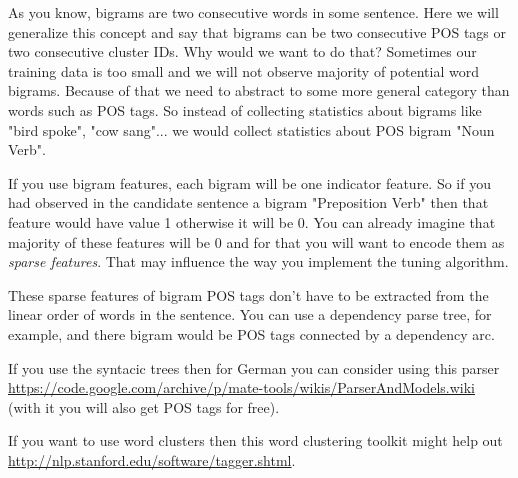 As you know, bigrams are two consecutive words in some sentence. Here we will generalize this concept and say that bigrams can be two consecutive POS tags or two consecutive cluster IDs. Why would we want to do that? Sometimes our training data is too small and we will not observe majority of potential word bigrams. Because of that we need to abstract to some more general category than words such as POS tags. So instead of collecting statistics about bigrams like "bird spoke", "cow sang"... we would collect statistics about POS bigram "Noun Verb".

If you use bigram features, each bigram will be one indicator feature. So if you had observed in the candidate sentence a bigram "Preposition Verb" then that feature would have value 1 otherwise it will be 0. You can already imagine that majority of these features will be 0 and for that you will want to encode them as \textit{sparse features}. That may influence the way you implement the tuning algorithm.

These sparse features of bigram POS tags don't have to be extracted from the linear order of words in the sentence. You can use a dependency parse tree, for example, and there bigram would be POS tags connected by a dependency arc.

If you use the syntacic trees then for German you can consider using this parser \url{https://code.google.com/archive/p/mate-tools/wikis/ParserAndModels.wiki} (with it you will also get POS tags for free).

If you want to use word clusters then this word clustering toolkit might help out \url{http://nlp.stanford.edu/software/tagger.shtml}.

